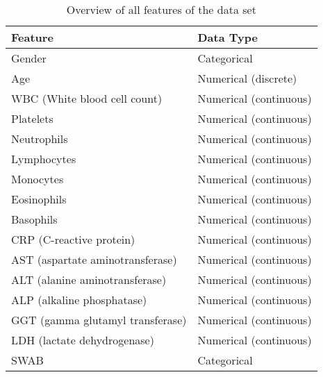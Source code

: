\begin{table}
\centering
\begin{tabular}{ll}
Feature                          & Data Type              \\ \hline
Gender                           & Categorical            \\
Age                              & Numerical (discrete)   \\
WBC (White blood cell count)     & Numerical (continuous) \\
Platelets                        & Numerical (continuous) \\
Neutrophils                      & Numerical (continuous) \\
Lymphocytes                      & Numerical (continuous) \\
Monocytes                        & Numerical (continuous) \\
Eosinophils                      & Numerical (continuous) \\
Basophils                        & Numerical (continuous) \\
CRP (C-reactive protein)         & Numerical (continuous) \\
AST (aspartate aminotransferase) & Numerical (continuous) \\
ALT (alanine aminotransferase)   & Numerical (continuous) \\
ALP (alkaline phosphatase)       & Numerical (continuous) \\
GGT (gamma glutamyl transferase) & Numerical (continuous) \\
LDH (lactate dehydrogenase)      & Numerical (continuous) \\
SWAB                             & Categorical           
\end{tabular}
\caption{Overview of all features of the data set}
\label{tab:overview-features}
\end{table}
